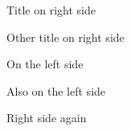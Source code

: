 \documentclass{book}
\newcommand*\cleartoleftpage{%
		\clearpage
		\ifodd\value{page}\hbox{}\newpage\fi
	}
\begin{document}
Title on right side

\cleardoublepage
Other title on right side

\cleartoleftpage
On the left side

\cleartoleftpage
Also on the left side

\cleardoublepage
Right side again
\end{document}
